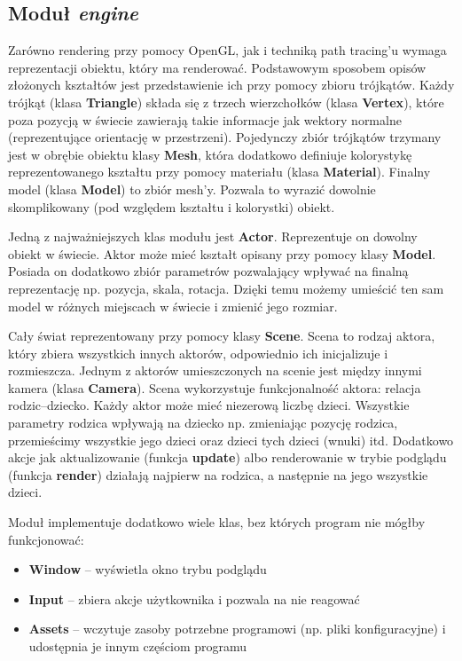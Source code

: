 \documentclass[inz,shortabstract]{iithesis}
\begin{document}
        \subsection{Moduł \textit{engine}}
            Zarówno rendering przy pomocy OpenGL, jak i techniką path tracing'u wymaga reprezentacji obiektu, który ma renderować. Podstawowym sposobem opisów złożonych kształtów jest przedstawienie ich przy pomocy zbioru trójkątów. Każdy trójkąt (klasa \textbf{Triangle}) składa się z trzech wierzchołków (klasa \textbf{Vertex}), które poza pozycją w świecie zawierają takie informacje jak wektory normalne (reprezentujące orientację w przestrzeni). Pojedynczy zbiór trójkątów trzymany jest w obrębie obiektu klasy \textbf{Mesh}, która dodatkowo definiuje kolorystykę reprezentowanego kształtu przy pomocy materiału (klasa \textbf{Material}). Finalny model (klasa \textbf{Model}) to zbiór mesh'y. Pozwala to wyrazić dowolnie skomplikowany (pod względem kształtu i kolorystki) obiekt. 
            
            Jedną z najważniejszych klas modułu jest \textbf{Actor}. Reprezentuje on dowolny obiekt w świecie. Aktor może mieć kształt opisany przy pomocy klasy \textbf{Model}. Posiada on dodatkowo zbiór parametrów pozwalający wpływać na finalną reprezentację np. pozycja, skala, rotacja. Dzięki temu możemy umieścić ten sam model w różnych miejscach w świecie i zmienić jego rozmiar.
            
            Cały świat reprezentowany przy pomocy klasy \textbf{Scene}. Scena to rodzaj aktora, który zbiera wszystkich innych aktorów, odpowiednio ich inicjalizuje i rozmieszcza. Jednym z aktorów umieszczonych na scenie jest między innymi kamera (klasa \textbf{Camera}). Scena wykorzystuje funkcjonalność aktora: relacja rodzic--dziecko. Każdy aktor może mieć niezerową liczbę dzieci. Wszystkie parametry rodzica wpływają na dziecko np. zmieniając pozycję rodzica, przemieścimy wszystkie jego dzieci oraz dzieci tych dzieci (wnuki) itd. Dodatkowo akcje jak aktualizowanie (funkcja \textbf{update}) albo renderowanie w trybie podglądu (funkcja \textbf{render}) działają najpierw na rodzica, a następnie na jego wszystkie dzieci.
            
            Moduł implementuje dodatkowo wiele klas, bez których program nie mógłby funkcjonować:
            \begin{itemize}
                \item \textbf{Window} -- wyświetla okno trybu podglądu
                \item \textbf{Input} -- zbiera akcje użytkownika i pozwala na nie reagować
                \item \textbf{Assets} -- wczytuje zasoby potrzebne programowi (np. pliki konfiguracyjne) i udostępnia je innym częściom programu 
            \end{itemize}
            
\end{document}

